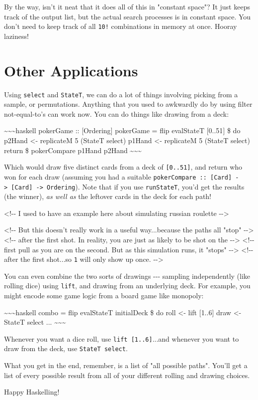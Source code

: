 \documentclass[]{article}
\begin{document}
By the way, isn't it neat that it does all of this in "constant space"? It just
keeps track of the output list, but the actual search processes is in constant
space. You don't need to keep track of all \texttt{10!} combinations in memory
at once. Hooray laziness!

\section{Other Applications}

Using \texttt{select} and \texttt{StateT}, we can do a lot of things involving
picking from a sample, or permutations. Anything that you used to awkwardly do
by using filter not-equal-to's can work now. You can do things like drawing from
a deck:

\textasciitilde{}\textasciitilde{}\textasciitilde{}haskell pokerGame ::
{[}Ordering{]} pokerGame = flip evalStateT {[}0..51{]} \$ do p2Hand \textless{}-
replicateM 5 (StateT select) p1Hand \textless{}- replicateM 5 (StateT select)
return \$ pokerCompare p1Hand p2Hand
\textasciitilde{}\textasciitilde{}\textasciitilde{}

Which would draw five distinct cards from a deck of \texttt{{[}0..51{]}}, and
return who won for each draw (assuming you had a suitable
\texttt{pokerCompare\ ::\ {[}Card{]}\ -\textgreater{}\ {[}Card{]}\ -\textgreater{}\ Ordering}).
Note that if you use \texttt{runStateT}, you'd get the results (the winner),
\emph{as well as} the leftover cards in the deck for each path!

\textless{}!-\/- I used to have an example here about simulating russian
roulette -\/-\textgreater{}

\textless{}!-\/- But this doesn't really work in a useful way...because the
paths all "stop" -\/-\textgreater{} \textless{}!-\/- after the first shot. In
reality, you are just as likely to be shot on the -\/-\textgreater{}
\textless{}!-\/- first pull as you are on the second. But as this simulation
runs, it "stops" -\/-\textgreater{} \textless{}!-\/- after the first shot...so
\texttt{1} will only show up once. -\/-\textgreater{}

You can even combine the two sorts of drawings -\/-\/- sampling independently
(like rolling dice) using \texttt{lift}, and drawing from an underlying deck.
For example, you might encode some game logic from a board game like monopoly:

\textasciitilde{}\textasciitilde{}\textasciitilde{}haskell combo = flip
evalStateT initialDeck \$ do roll \textless{}- lift {[}1..6{]} draw \textless{}-
StateT select ... \textasciitilde{}\textasciitilde{}\textasciitilde{}

Whenever you want a dice roll, use \texttt{lift\ {[}1..6{]}}...and whenever you
want to draw from the deck, use \texttt{StateT\ select}.

What you get in the end, remember, is a list of "all possible paths". You'll get
a list of every possible result from all of your different rolling and drawing
choices.

Happy Haskelling!
\end{document}
